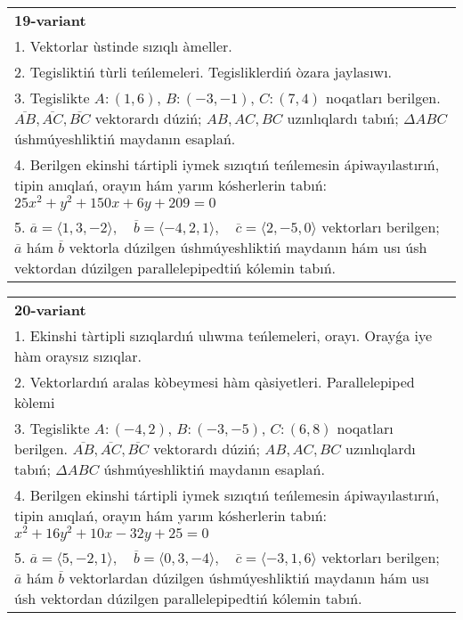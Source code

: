 \documentclass{article}
\begin{document}
\begin{tabular}{m{17cm}}
\textbf{19-variant}\\
1. Vektorlar ùstinde sızıqlı àmeller.\\

2. Tegisliktiń tùrli teńlemeleri. Tegisliklerdiń òzara jaylasıwı.\\

3. Tegislikte $A: (1, 6)$, $B: (-3, -1)$, $C: (7, 4)$ noqatları berilgen. $\overline{AB}, \overline{AC}, \overline{BC}$ vektorardı dúziń; $AB, AC, BC$ uzınlıqlardı tabıń; $\Delta ABC$ úshmúyeshliktiń maydanın esaplań. \\

4. Berilgen ekinshi tártipli iymek sızıqtıń teńlemesin ápiwayılastırıń, tipin anıqlań, orayın hám yarım kósherlerin tabıń: $25x^2+y^2+150x+6y+209=0$\\

5. \(\overline{a} = \langle 1, 3, -2 \rangle, \quad \overline{b} = \langle -4, 2, 1 \rangle, \quad \overline{c} = \langle 2, -5, 0 \rangle\) vektorları berilgen; \(\overline{a}\) hám \(\overline{b}\) vektorla dúzilgen úshmúyeshliktiń maydanın hám usı úsh vektordan dúzilgen parallelepipedtiń kólemin tabıń.
\end{tabular}
\vspace{1cm}


\begin{tabular}{m{17cm}}
\textbf{20-variant}\\
1. Ekinshi tàrtipli sızıqlardıń ulıwma teńlemeleri, orayı. Orayǵa iye hàm oraysız sızıqlar.\\

2. Vektorlardıń aralas kòbeymesi hàm qàsiyetleri. Parallelepiped kòlemi\\

3. Tegislikte $A: (-4, 2)$, $B: (-3, -5)$, $C: (6, 8)$ noqatları berilgen. $\overline{AB}, \overline{AC}, \overline{BC}$ vektorardı dúziń; $AB, AC, BC$ uzınlıqlardı tabıń; $\Delta ABC$ úshmúyeshliktiń maydanın esaplań. \\

4. Berilgen ekinshi tártipli iymek sızıqtıń teńlemesin ápiwayılastırıń, tipin anıqlań, orayın hám yarım kósherlerin tabıń: $x^2+16y^2+10x-32y+25=0$\\

5. \(\overline{a} = \langle 5, -2, 1 \rangle, \quad \overline{b} = \langle 0, 3, -4 \rangle, \quad \overline{c} = \langle -3, 1, 6 \rangle\) vektorları berilgen; \(\overline{a}\) hám \(\overline{b}\) vektorlardan dúzilgen úshmúyeshliktiń maydanın hám usı úsh vektordan dúzilgen parallelepipedtiń kólemin tabıń.
\end{tabular}
\vspace{1cm}
\end{document}
